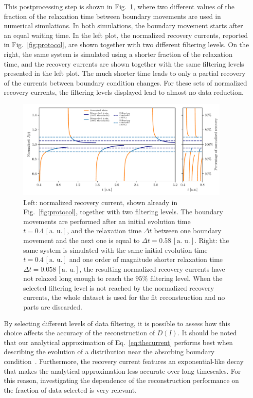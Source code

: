 {This postprocessing step is shown in Fig.~\ref{fig:postprocessing}, where two different values of the fraction of the relaxation time between boundary movements are used in numerical simulations. In both simulations, the boundary movement starts after an equal waiting time. In the left plot, the normalized recovery currents, reported in Fig.~\ref{fig:protocol}, are shown together with two different filtering levels. On the right, the same system is simulated using a shorter fraction of the relaxation time, and the recovery currents are shown together with the same filtering levels presented in the left plot. The much shorter time leads to only a partial recovery of the currents between boundary condition changes. For these sets of normalized recovery currents, the filtering levels displayed lead to almost no data reduction.
%
\begin{figure}[t]
    \centering 
    \includegraphics[width=0.95\textwidth]{4_probing_the_diffusive_behavior/figs/final/the_discarded_data.pdf}
    \caption{Left: normalized recovery current, shown already in Fig.~\ref{fig:protocol}, together with two filtering levels. The boundary movements are performed after an initial evolution time $t=0.4 \, [\text{a. u.}]$, and the relaxation time $\Delta t$ between one boundary movement and the next one is equal to $\Delta t=0.58 \, [\text{a. u.}]$. Right: the same system is simulated with the same initial evolution time $t=0.4 \, [\text{a. u.}]$ and one order of magnitude shorter relaxation time $\Delta t=0.058 \, [\text{a. u.}]$, the resulting normalized recovery currents have not relaxed long enough to reach the $95\%$ filtering level. When the selected filtering level is not reached by the normalized recovery currents, the whole dataset is used for the fit reconstruction and no parts are discarded.}
    \label{fig:postprocessing}
\end{figure}
%

By selecting different levels of data filtering, it is possible to assess how this choice affects the accuracy of the reconstruction of $D(I)$. It should be noted that our analytical approximation of Eq.~\eqref{eq:thecurrent} performs best when describing the evolution of a distribution near the absorbing boundary condition~\cite{montanari:ipac2021:tupab233}. Furthermore, the recovery current features an exponential-like decay that makes the analytical approximation less accurate over long timescales. For this reason, investigating the dependence of the reconstruction performance on the fraction of data selected is very relevant.

}
